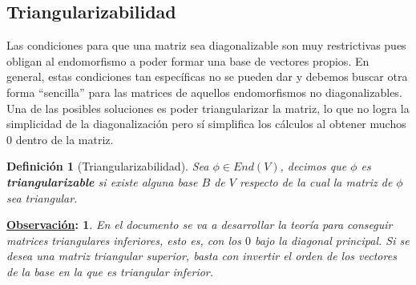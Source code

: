 \documentclass[10pt,a4paper,openright]{book}
\theoremstyle{break}
\newtheorem*{defi}{Definición}
\newtheorem*{obs}{\underline{Observación}:}
\begin{document}
\subsection{Triangularizabilidad}
Las condiciones para que una matriz sea diagonalizable son muy restrictivas pues obligan al endomorfismo a poder formar una base de vectores propios. En general, estas condiciones tan específicas no se pueden dar y debemos buscar otra forma ``sencilla'' para las matrices de aquellos endomorfismos no diagonalizables. Una de las posibles soluciones es poder triangularizar la matriz, lo que no logra la simplicidad de la diagonalización pero sí simplifica los cálculos al obtener muchos 0 dentro de la matriz.

\begin{defi}[Triangularizabilidad]
Sea $\phi \in End(V)$, decimos que $\phi$ es \textbf{triangularizable} si existe alguna base $B$ de $V$ respecto de la cual la matriz de $\phi$ sea triangular.
\end{defi}

\begin{obs}
En el documento se va a desarrollar la teoría para conseguir matrices triangulares inferiores, esto es, con los $0$ bajo la diagonal principal. Si se desea una matriz triangular superior, basta con invertir el orden de los vectores de la base en la que es triangular inferior.
\end{obs}
\end{document}
